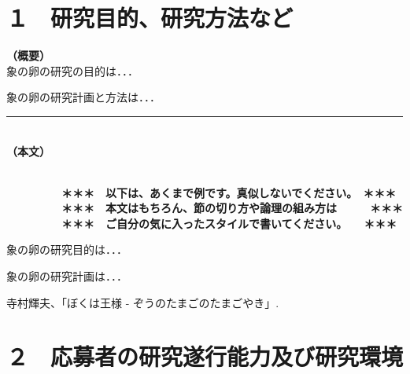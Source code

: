 \documentclass[11pt,a4j,dvipdfmx]{jarticle} 					%
\newcommand{\研究課題名}{象の卵}
\newcommand{\研究機関名}{逢坂大学}
\newcommand{\研究代表者氏名}{湯川秀樹}
\newcommand{\研究期間の最終元号年度}{8}  %
\begin{document}

\section{１　研究目的、研究方法など}

\noindent
\textbf{（概要）}\\
	象の卵の研究の目的は．．．	

	象の卵の研究計画と方法は．．．
	\vspace*{10zw}	%

\noindent
\rule{\linewidth}{1pt}\\
\noindent
\textbf{（本文）}
\JSPSInstructions	%

\textbf{\\　　　　　＊＊＊　以下は、あくまで例です。真似しないでください。　＊＊＊\\
　　　　　＊＊＊　本文はもちろん、節の切り方や論理の組み方は　　　＊＊＊\\
　　　　　＊＊＊　ご自分の気に入ったスタイルで書いてください。　　＊＊＊}

	 象の卵の研究目的は．．．

	象の卵の研究計画は．．．

	\vspace{1cm}
	\begin{thebibliography}{99}
		 寺村輝夫、「ぼくは王様 - ぞうのたまごのたまごやき」.
	\end{thebibliography}




\section{２　応募者の研究遂行能力及び研究環境}

\PapersInstructions	%
\end{document}

